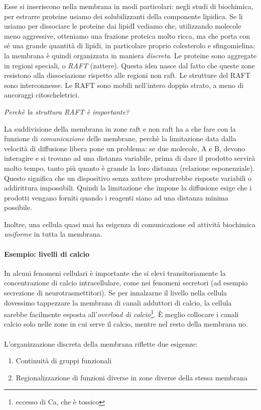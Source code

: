 \documentclass[a4paper,12pt]{article}
\begin{document}
Esse si inseriscono nella membrana in modi particolari: negli studi di biochimica, per estrarre proteine usiamo dei solubilizzanti della componente lipidica. Se li usiamo per dissociare le proteine dai lipidI vediamo che, utilizzando molecole meno aggressive, otteniamo una frazione proteica molto ricca, ma che porta con sé una grande quantità di lipidi, in particolare proprio colesterolo e sfingomielina: la  membrana è quindi organizzata in maniera \emph{discreta}. Le proteine sono aggregate in regioni speciali, o \emph{RAFT} (zattere). Questa idea nasce dal fatto che queste zone resistono alla dissociazione rispetto alle regioni non raft. Le strutture del RAFT sono interconnesse. Le RAFT sono mobili nell'intero doppio strato, a meno di ancoraggi citoscheletrici.

\emph{Perchè la struttura RAFT è importante?}

La suddivisione della membrana in zone raft e non raft ha a che fare con la funzione di \emph{comunicazione} delle membrane, perchè la limitazione data dalla velocità di diffusione libera pone un problema: se due molecole, A e B, devono interagire e si trovano ad una distanza variabile, prima di dare il prodotto servirà molto tempo, tanto più quanto è grande la loro distanza (relazione esponenziale).
Questo significa che un dispositivo senza zattere produrrebbe risposte variabili o addirittura impossibili. Quindi la limitazione che impone la diffusione esige che i prodotti vengano forniti quando i reagenti siano ad una distanza minima possibile.

Inoltre, una cellula quasi mai ha esigenza di comunicazione ed attività biochimica \emph{uniforme} in tutta la membrana.
\paragraph{Esempio: livelli di calcio}
In alcuni fenomeni cellulari è importante che si elevi transitoriamente la concentrazione di calcio intracellulare, come nei fenomeni secretori (ad esempio secrezione di neurotrasmettitori).
Se per innalzarne il livello nella cellula dovessimo tappezzare la membrana di canali adduttori di calcio, la cellula sarebbe facilmente esposta all'\emph{overload di calcio}\footnote{eccesso di Ca, che è tossico}.
È meglio collocare i canali calcio solo nelle zone in cui serve il calcio, mentre nel resto della membrana no.

\paragraph{}
L'organizzazione discreta della membrana riflette due esigenze:
\begin{enumerate}
\item{Continuità di gruppi funzionali}
\item{Regionalizzazione di funzioni diverse in zone diverse della stessa membrana}
\end{enumerate}
\end{document}
